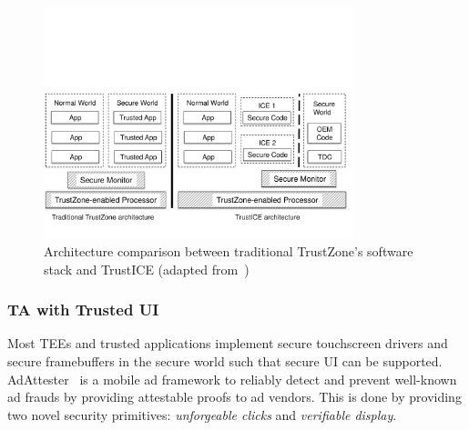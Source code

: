 
\begin{figure}[t!]
	\centering
	\includegraphics[width=0.80\textwidth]{img/trustICE.pdf}
	\caption{Architecture comparison between traditional TrustZone's software stack and TrustICE (adapted from~\cite{sun2015trustice})}
	\label{fig:trustICE_architecture}
\end{figure}

\subsubsection{TA with Trusted UI}


Most TEEs and trusted applications implement secure touchscreen drivers and secure framebuffers in the secure world such that secure UI can be supported.
AdAttester~\cite{li2015adattester} is a mobile ad framework to reliably detect and prevent well-known ad frauds by providing attestable proofs to ad vendors. This is done by providing two novel security primitives: \emph{unforgeable clicks} and \emph{verifiable display}.

